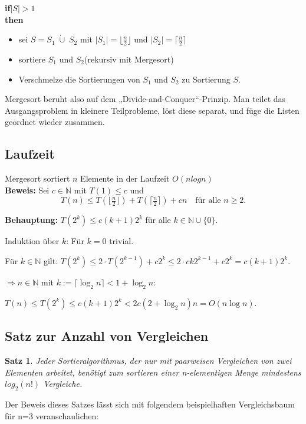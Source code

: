 \documentclass{article}
\newtheorem{thm}{Satz}
\begin{document}
\textbf{if}$|S| > 1$ \\
\textbf{then} \begin{itemize}
 \item sei $S = S_1 \; \dot{\cup}\;S_2$ mit $|S_1| = \lfloor \frac{n}{2} \rfloor$ und $|S_2| =\lceil \frac{n}{2} \rceil$
\item sortiere $S_1$ und $S_2$(rekursiv mit Mergesort)
\item  Verschmelze die Sortierungen von $S_1$ und $S_2$ zu Sortierung $S$.

\end{itemize}
Mergesort beruht also auf dem „Divide-and-Conquer“-Prinzip. Man teilet das Ausgangsproblem in kleinere Teilprobleme, löst diese separat, und füge die Listen geordnet wieder zusammen.

\subsection{Laufzeit}
Mergesort sortiert $n$ Elemente in der Laufzeit $O(n log n)$
 \\
 \textbf{Beweis:}
Sei $c \in \mathbb{N}$ mit $T(1) \leq c$ und 
\[
T(n) \leq T(\lfloor \tfrac{n}{2} \rfloor) + T(\lceil \tfrac{n}{2} \rceil) + cn \quad \text{für alle } n \geq 2.
\]

\textbf{Behauptung:} $T(2^k) \leq c(k+1)2^k$ für alle $k \in \mathbb{N} \cup \{0\}$.

Induktion über $k$: 
Für $k = 0$ trivial. 

Für $k \in \mathbb{N}$ gilt:
$T(2^k) \leq 2 \cdot T(2^{k-1}) + c 2^k \leq 2 \cdot ck 2^{k-1} + c 2^k = c(k+1)2^k.$

$\Rightarrow   n \in \mathbb{N}$ mit $k := \lceil \log_2 n \rceil < 1 + \log_2 n$:

$T(n) \leq T(2^k) \leq c(k+1)2^k < 2c(2 + \log_2 n)n = O(n \log n).$

\subsection{Satz zur Anzahl von Vergleichen}
\begin{thm}
Jeder Sortieralgorithmus, der nur mit paarweisen Vergleichen von zwei Elementen arbeitet, benötigt zum sortieren einer n-elementigen Menge mindestens $log_2(n!)$ Vergleiche.
\end{thm}
Der Beweis dieses Satzes lässt sich mit folgendem beispielhaften Vergleichsbaum für n=3 veranschaulichen: \\
\end{document}
